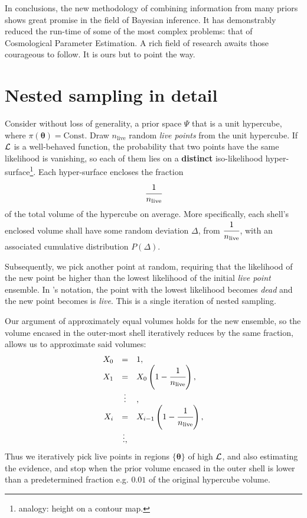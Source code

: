 \documentclass[usenatbib]{mnras}
\begin{document}
In conclusions, the new methodology of combining information from many
priors shows great promise in the field of Bayesian inference. It has
demonstrably reduced the run-time of some of the most complex
problems: that of Cosmological Parameter Estimation. A rich field of
research awaits those courageous to follow. It is ours but to point
the way.




\appendix
\section{Nested sampling in detail}\label{sec:ns}
Consider without loss of generality, a prior space \(\Psi\) that is a
unit hypercube, where \(\pi(\bm{\theta}) = \text{Const.}\) Draw
\(n_\text{live}\) random \emph{live points} from the unit
hypercube. If \({\cal L}\) is a well-behaved function, the probability
that two points have the same likelihood is vanishing, so each of them
lies on a \textbf{distinct} iso-likelihood
hyper-surface\footnote{analogy: height on a contour map. }. Each
hyper-surface encloses the fraction
\begin{equation}
\cfrac{1}{n_\text{live}}
\end{equation}
of the total volume of the hypercube on average. More specifically,
each shell's enclosed volume shall have some random deviation \(\Delta\), from
\(\cfrac{1}{n_\text{live}}\), with an associated cumulative
distribution \(P(\Delta)\).

Subsequently, we pick another point at random, requiring that the
likelihood of the new point be higher than the lowest likelihood of
the initial \emph{live point} ensemble. In \citeauthor{Skilling2006}'s
notation, the point with the lowest likelihood becomes \emph{dead} and
the new point becomes is \emph{live}. This is a single iteration of
nested sampling.

Our argument of approximately equal volumes holds for the new
ensemble, so the volume encased in the outer-most shell iteratively
reduces by the same fraction, allows us to approximate said volumes:
\begin{equation}\label{eq:recurrence-relation}
  \begin{array}{rcl}
  X_{0} &=  &1, \\
  X_{1} &= &X_{0} \left(1- \cfrac{1}{n_\text{live}}\right),\\
  & \vdots &, \\
  X_{i} &= &X_{i-1}\left(1- \cfrac{1}{n_\text{live}}\right),\\
  & \vdots, &
\end{array}
\end{equation}
Thus we iteratively pick live points in regions $\{\bm{\theta}\}$ of
high \({\cal L}\), and also estimating the evidence, and stop when the
prior volume encased in the outer shell is lower than a predetermined
fraction e.g. \(0.01\) of the original hypercube volume.
\end{document}
